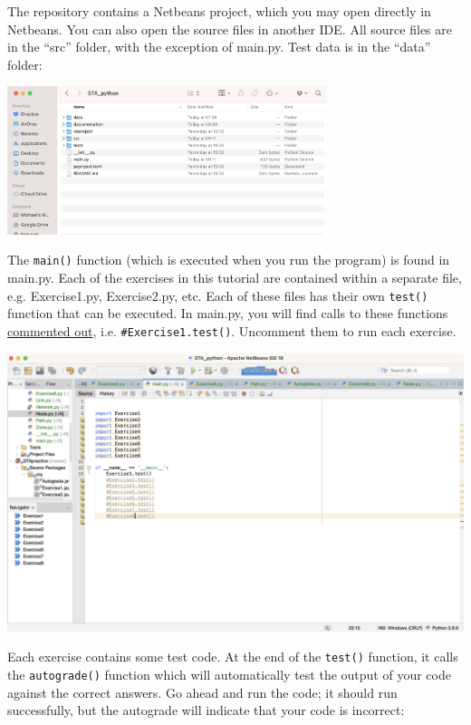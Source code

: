 \documentclass[11pt]{article}
\begin{document}
The repository contains a Netbeans project, which you may open directly in Netbeans. You can also open the source files in another IDE. All source files are in the ``src'' folder, with the exception of main.py. Test data is in the ``data'' folder:

\begin{center}
	\includegraphics[width=0.7\textwidth]{folder.png}
\end{center}

The \texttt{main()} function (which is executed when you run the program) is found in main.py. Each of the exercises in this tutorial are contained within a separate file, e.g. Exercise1.py, Exercise2.py, etc. Each of these files has their own \texttt{test()} function that can be executed.
In main.py, you will find calls to these functions \href{https://www.w3schools.com/python/python_comments.asp}{commented out}, i.e. \texttt{\#Exercise1.test()}. Uncomment them to run each exercise. 

\begin{center}
	\includegraphics[width=\textwidth]{netbeans1.png}
\end{center}



Each exercise contains some test code. At the end of the \texttt{test()} function, it calls the \texttt{autograde()} function which will automatically test the output of your code against the correct answers. Go ahead and run the code; it should run successfully, but the autograde will indicate that your code is incorrect:
\end{document}
